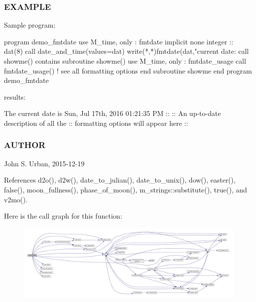 \subsubsection*{E\+X\+A\+M\+P\+LE}

\begin{DoxyVerb}Sample program:

 program demo_fmtdate
 use M_time, only : fmtdate
 implicit none
 integer :: dat(8)
    call date_and_time(values=dat)
    write(*,*)fmtdate(dat,"current date: %
    call showme()
 contains
 subroutine showme()
    use M_time, only : fmtdate_usage
    call fmtdate_usage() ! see all formatting options
 end subroutine showme
 end program demo_fmtdate

results:

   The current date is Sun, Jul 17th, 2016 01:21:35 PM
    ::
    :: An up-to-date description of all the
    :: formatting options will appear here
    ::
\end{DoxyVerb}


\subsubsection*{A\+U\+T\+H\+OR}

John S. Urban, 2015-\/12-\/19 

References d2o(), d2w(), date\+\_\+to\+\_\+julian(), date\+\_\+to\+\_\+unix(), dow(), easter(), false(), moon\+\_\+fullness(), phase\+\_\+of\+\_\+moon(), m\+\_\+strings\+::substitute(), true(), and v2mo().

Here is the call graph for this function\+:
\nopagebreak
\begin{figure}[H]
\begin{center}
\leavevmode
\includegraphics[width=350pt]{namespacem__time_a2cb84c9b8af4f395b76aed76e1431328_cgraph}
\end{center}
\end{figure}
\mbox{\label{namespacem__time_a914927f70fb9495af1be2e484b967111}} 
